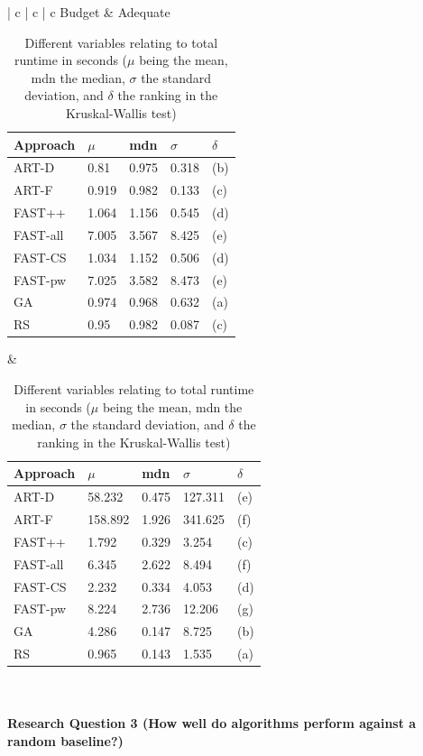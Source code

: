 \begin{table}[htpb]
	\caption[Runtime performance statistical results]{Different variables relating to total runtime in seconds ($\mu$ being the mean, mdn the median, $\sigma$ the standard deviation, and $\delta$ the ranking in the Kruskal-Wallis test)}\label{tab:total_stats}
	\centering
	\begin{tabular}{| c | c | c}
	\midrule
	Budget & Adequate \\
	\midrule
	{\begin{tabular}{l | l | l | l | l}
		Approach & $\mu$ & mdn & $\sigma$ & $\delta$ \\
		\midrule
		ART-D & 0.81 & 0.975 & 0.318 & (b) \\
		ART-F & 0.919 & 0.982 & 0.133 & (c) \\
		FAST++ & 1.064 & 1.156 & 0.545 & (d) \\
		FAST-all & 7.005 & 3.567 & 8.425 & (e) \\
		FAST-CS & 1.034 & 1.152 & 0.506 & (d) \\
		FAST-pw & 7.025 & 3.582 & 8.473 & (e) \\
		GA & 0.974 & 0.968 & 0.632 & (a) \\
		RS & 0.95 & 0.982 & 0.087 & (c) \\
	\end{tabular}} &
	{ \begin{tabular}{l | l | l | l | l}
		Approach & $\mu$ & mdn & $\sigma$ & $\delta$ \\
		\midrule
		ART-D & 58.232 & 0.475 & 127.311 & (e) \\
		ART-F & 158.892 & 1.926 & 341.625 & (f) \\
		FAST++ & 1.792 & 0.329 & 3.254 & (c) \\
		FAST-all & 6.345 & 2.622 & 8.494 & (f) \\
		FAST-CS & 2.232 & 0.334 & 4.053 & (d) \\
		FAST-pw & 8.224 & 2.736 & 12.206 & (g) \\
		GA & 4.286 & 0.147 & 8.725 & (b) \\
		RS & 0.965 & 0.143 & 1.535 & (a) \\
	\end{tabular}} \\
	\bottomrule
	\end{tabular}
\end{table}


\paragraph{Research Question 3 (How well do algorithms perform against a random baseline?)}

